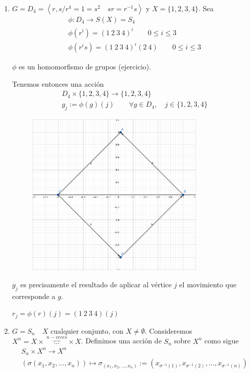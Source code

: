 \documentclass{article}
\begin{document}
\begin{enumerate}[1)]
\item $G=D_4=\left\langle r,s/r^4=1=s^2\quad sr=r^{-1}s\right\rangle$ y $X=\{1,2,3,4\}$. Sea
\begin{gather*}
\phi:D_4\longrightarrow S(X)=S_4 \\
\phi(r^i)=(1\:2\:3\:4)^i \qquad 0\leq i\leq 3 \\
\phi(r^is)=(1\:2\:3\:4)^i(2\:4)\qquad 0\leq i\leq 3
\end{gather*}

$\phi$ es un homomorfismo de grupos (ejercicio).

Tenemos entonces una acción
\begin{gather*}
D_4\times \{1,2,3,4\} \longrightarrow \{1,2,3,4\} \\
g_j:=\phi(g)(j)\qquad \forall g\in D_4,\quad j\in\{1,2,3,4\}
\end{gather*}

\begin{figure}
\centering
\includegraphics[scale=1,width=0.8\textwidth]{grafica_125.png}
\end{figure}

$g_j$ es precisamente el resultado de aplicar al vértice $j$ el movimiento que corresponde a $g$.

$r_j=\phi(r)(j)=(1\:2\:3\:4)(j)$

\item $G=S_n\quad X$ cualquier conjunto, con $X\neq \emptyset$. Consideremos $X^n=X\times~\overbrace{\ldots}^{n-veces}\times X$. Definimos una acción de $S_n$ sobre $X^n$ como sigue
\begin{gather*}
S_n\times X^n\longrightarrow X^n\\
(\sigma(x_1,x_2,\ldots,x_n))\longmapsto \sigma_{(x_1,x_2,\ldots,x_n)}:=(x_{\sigma^{-1}(1)},x_{\sigma^{-1}(2)},\ldots,x_{\sigma^{-1}(n)})
\end{gather*}


\end{enumerate}
\end{document}
